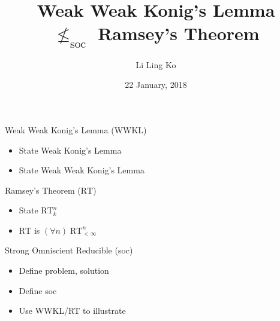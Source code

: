 \documentclass{beamer}
\title{Weak Weak Konig's Lemma \\$\not\leq_{\text{soc}}$ Ramsey's Theorem}
\author{Li Ling Ko}
\institute{University of Notre Dame}
\date{22 January, 2018}
\begin{document}
\begin{frame}
  \titlepage
\end{frame}

\begin{frame}{Weak Weak Konig's Lemma (WWKL)}
  \begin{itemize}
    \item State Weak Konig's Lemma
    \item State Weak Weak Konig's Lemma
  \end{itemize}
\end{frame}

\begin{frame}{Ramsey's Theorem ($\text{RT}$)}
  \begin{itemize}
    \item State $\text{RT}_k^n$
    \item $\text{RT}$ is $(\forall n)\; \text{RT}_{<\infty}^n$
  \end{itemize}
\end{frame}

\begin{frame}{Strong Omniscient Reducible (soc)}
  \begin{itemize}
    \item Define problem, solution
    \item Define soc
    \item Use WWKL/RT to illustrate
  \end{itemize}
\end{frame}
\end{document}
